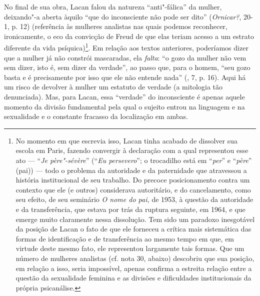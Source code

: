 No final de sua obra, Lacan falou da natureza ``anti"-fálica'' da mulher,
deixando"-a aberta àquilo ``que do inconsciente não pode ser dito''
(\emph{Ornicar?}, 20-1, p. 12) (referência às mulheres analistas nas
quais podemos reconhecer, ironicamente, o eco da convicção de Freud de
que elas teriam acesso a um estrato diferente da vida
psíquica)\footnote{No momento em que escrevia isso, Lacan tinha acabado
  de dissolver sua escola em Paris, fazendo convergir à declaração com a
  qual representou esse ato --- ``\emph{Je père"-sévère}'' (``\emph{Eu
  persevero}''; o trocadilho está em ``\emph{per}'' e ``\emph{père}''
  (pai)) --- todo o problema da autoridade e da paternidade que
  atravessou a história institucional de seu trabalho. Do precoce
  posicionamento contra um contexto que ele (e outros) considerava
  autoritário, e do cancelamento, como seu efeito, de seu seminário
  \emph{O nome do pai,} de 1953, à questão da autoridade e da
  transferência, que estava por trás da ruptura seguinte, em 1964, e que
  emerge muito claramente nessa dissolução. Tem sido um paradoxo
  inesgotável da posição de Lacan o fato de que ele forneceu a crítica
  mais sistemática das formas de identificação e de transferência ao
  mesmo tempo em que, em virtude deste mesmo fato, ele representou
  largamente tais formas. Que um número de mulheres analistas (cf. nota
  30, abaixo) descobriu que sua posição, em relação a isso, seria
  impossível, apenas confirma a estreita relação entre a questão da
  sexualidade feminina e as divisões e dificuldades institucionais da
  própria psicanálise.}. Em relação aos textos anteriores, poderíamos
dizer que a mulher já não constrói mascaradas, ela \emph{falta}: ``o
gozo da mulher não vem sem dizer, isto é, sem dizer da verdade'', ao
passo que, para o homem, ``seu gozo basta e é precisamente por isso que
ele não entende nada'' (, 7, p. 16). Aqui há um risco de devolver à
mulher um estatuto de verdade (a mitologia tão denunciada). Mas, para
Lacan, essa ``verdade'' do inconsciente é apenas aquele momento da
divisão fundamental pela qual o sujeito entrou na linguagem e na
sexualidade e o constante fracasso da localização em ambas.

